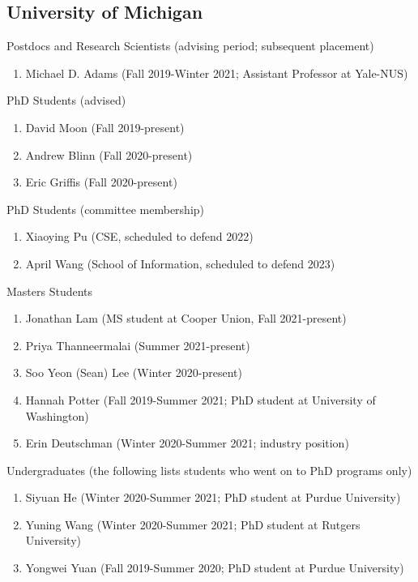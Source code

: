\documentclass[10pt,letterpaper]{article}
\renewenvironment{itemize}{
  \begin{list}{}{
    \setlength{\leftmargin}{1.25em}
    \setlength{\itemsep}{0.25em}
    \setlength{\parskip}{0pt}
    \setlength{\parsep}{0.2em}
  }
}{
  \end{list}
}
\begin{document}
\subsection*{University of Michigan}
\begin{itemize}
\item Postdocs and Research Scientists (advising period; subsequent placement)
  \begin{enumerate}
    \item Michael D. Adams (Fall 2019-Winter 2021; Assistant Professor at Yale-NUS)
  \end{enumerate}
\item PhD Students (advised)
  \begin{enumerate}
    \item David Moon (Fall 2019-present)
    \item Andrew Blinn (Fall 2020-present)
    \item Eric Griffis (Fall 2020-present)
  \end{enumerate}
\item PhD Students (committee membership)
  \begin{enumerate}
    \item Xiaoying Pu (CSE, scheduled to defend 2022)
    \item April Wang (School of Information, scheduled to defend 2023)
  \end{enumerate}
\item Masters Students
  \begin{enumerate}
    \item Jonathan Lam (MS student at Cooper Union, Fall 2021-present)
    \item Priya Thanneermalai (Summer 2021-present)
    \item Soo Yeon (Sean) Lee (Winter 2020-present)
    \item Hannah Potter (Fall 2019-Summer 2021; PhD student at University of Washington)
    \item Erin Deutschman (Winter 2020-Summer 2021; industry position)
  \end{enumerate}
\item Undergraduates (the following lists students who went on to PhD programs only)
  \begin{enumerate}
    \item Siyuan He (Winter 2020-Summer 2021; PhD student at Purdue University)
    \item Yuning Wang (Winter 2020-Summer 2021; PhD student at Rutgers University)
    \item Yongwei Yuan (Fall 2019-Summer 2020; PhD student at Purdue University)

\end{enumerate}
\end{itemize}
\end{document}
